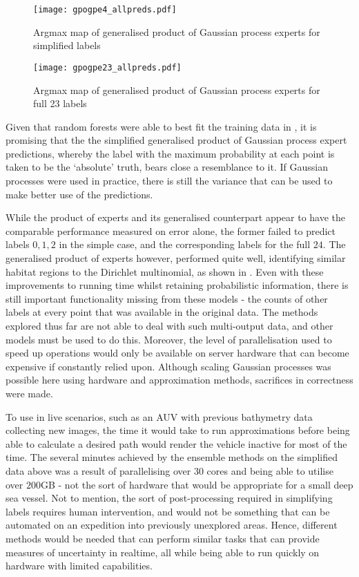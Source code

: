 \begin{figure}
    \begin{minipage}{\linewidth}
        \texttt{[image: gpogpe4\_allpreds.pdf]}
        \caption{Argmax map of generalised product of Gaussian process experts for simplified labels}
        \label{fig:gpogpe4}
    \end{minipage}

    \begin{minipage}{\linewidth}
        \texttt{[image: gpogpe23\_allpreds.pdf]}
        \caption{Argmax map of generalised product of Gaussian process experts for full 23 labels}
        \label{fig:gpogpe23}
    \end{minipage}
    \caption{}
\end{figure}

Given that random forests were able to best fit the training data in , it is promising that the the simplified generalised product of Gaussian process expert predictions, whereby the label with the maximum probability at each point is taken to be the `absolute' truth, bears close a resemblance to it. If Gaussian processes were used in practice, there is still the variance that can be used to make better use of the predictions. 

While the product of experts and its generalised counterpart appear to have the comparable performance measured on error alone, the former failed to predict labels $0, 1, 2$ in the simple case, and the corresponding labels for the full $24$. The generalised product of experts however, performed quite well, identifying similar habitat regions to the Dirichlet multinomial, as shown in . Even with these improvements to running time whilst retaining probabilistic information, there is still important functionality missing from these models - the counts of other labels at every point that was available in the original data. The methods explored thus far are not able to deal with such multi-output data, and other models must be used to do this. Moreover, the level of parallelisation used to speed up operations would only be available on server hardware that can become expensive if constantly relied upon. Although scaling Gaussian processes was possible here using hardware and approximation methods, sacrifices in correctness were made. 

To use in live scenarios, such as an AUV with previous bathymetry data collecting new images, the time it would take to run approximations before being able to calculate a desired path would render the vehicle inactive for most of the time. The several minutes achieved by the ensemble methods on the simplified data above was a result of parallelising over $30$ cores and being able to utilise over $200$GB - not the sort of hardware that would be appropriate for a small deep sea vessel. Not to mention, the sort of post-processing required in simplifying labels requires human intervention, and would not be something that can be automated on an expedition into previously unexplored areas. Hence, different methods would be needed that can perform similar tasks that can provide measures of uncertainty in realtime, all while being able to run quickly on hardware with limited capabilities.

